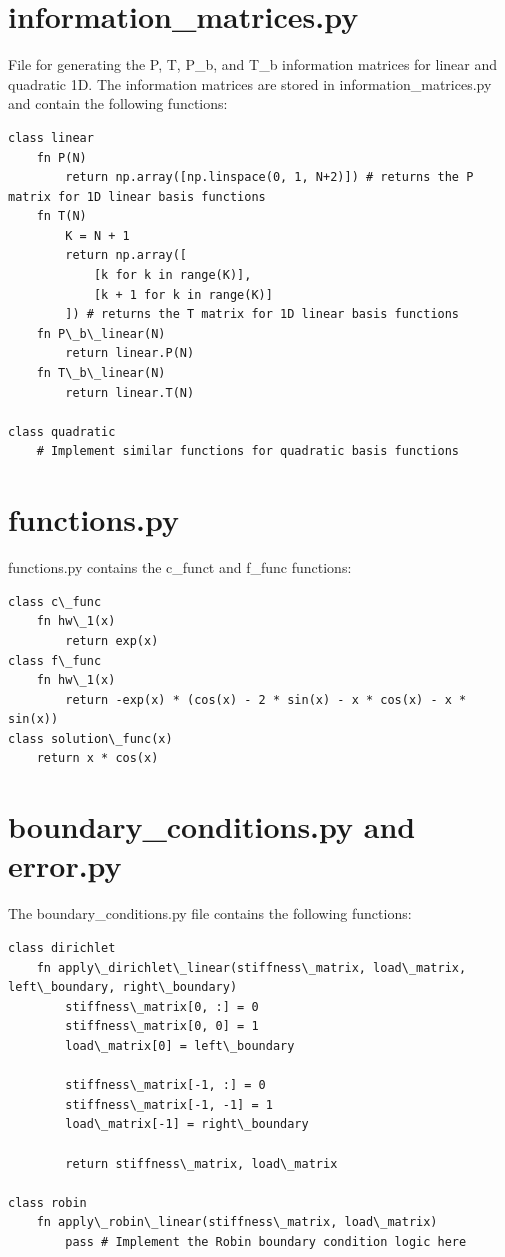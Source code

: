 \documentclass[12pt, oneside]{book}
\begin{document}
\section{information\_matrices.py}

File for generating the P, T, P\_b, and T\_b information matrices 
for linear and quadratic 1D. The information matrices are stored in information\_matrices.py and contain the following functions:

\begin{lstlisting}
class linear 
    fn P(N)
        return np.array([np.linspace(0, 1, N+2)]) # returns the P matrix for 1D linear basis functions
    fn T(N)
        K = N + 1
        return np.array([
            [k for k in range(K)], 
            [k + 1 for k in range(K)]
        ]) # returns the T matrix for 1D linear basis functions
    fn P\_b\_linear(N)
        return linear.P(N) 
    fn T\_b\_linear(N)
        return linear.T(N)

class quadratic
    # Implement similar functions for quadratic basis functions
\end{lstlisting}

\section{functions.py}

functions.py contains the c\_funct and f\_func functions:

\begin{lstlisting}
class c\_func
    fn hw\_1(x)
        return exp(x) 
class f\_func
    fn hw\_1(x)
        return -exp(x) * (cos(x) - 2 * sin(x) - x * cos(x) - x * sin(x))
class solution\_func(x)
    return x * cos(x) 
\end{lstlisting}

\section{boundary\_conditions.py and error.py}

The boundary\_conditions.py file contains the following functions:

\begin{lstlisting}
class dirichlet
    fn apply\_dirichlet\_linear(stiffness\_matrix, load\_matrix, left\_boundary, right\_boundary)
        stiffness\_matrix[0, :] = 0
        stiffness\_matrix[0, 0] = 1
        load\_matrix[0] = left\_boundary

        stiffness\_matrix[-1, :] = 0
        stiffness\_matrix[-1, -1] = 1
        load\_matrix[-1] = right\_boundary

        return stiffness\_matrix, load\_matrix

class robin
    fn apply\_robin\_linear(stiffness\_matrix, load\_matrix)
        pass # Implement the Robin boundary condition logic here
\end{lstlisting}
\end{document}
